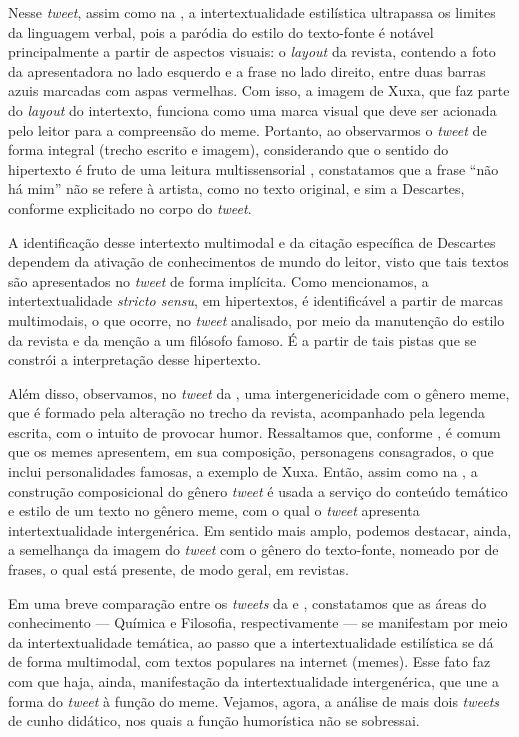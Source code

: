 \documentclass{textolivre}
\begin{document}
Nesse \textit{tweet}, assim como na , a intertextualidade estilística ultrapassa os limites da linguagem verbal, pois a paródia do estilo do texto-fonte é notável principalmente a partir de aspectos visuais: o \textit{layout} da revista, contendo a foto da apresentadora no lado esquerdo e a frase no lado direito, entre duas barras azuis marcadas com aspas vermelhas. Com isso, a imagem de Xuxa, que faz parte do \textit{layout} do intertexto, funciona como uma marca visual que deve ser acionada pelo leitor para a compreensão do meme. Portanto, ao observarmos o \textit{tweet} de forma integral (trecho escrito e imagem), considerando que o sentido do hipertexto é fruto de uma leitura multissensorial \cite{xavier_desafio_2015}, constatamos que a frase “não há mim” não se refere à artista, como no texto original, e sim a Descartes, conforme explicitado no corpo do \textit{tweet}.

A identificação desse intertexto multimodal e da citação específica de Descartes dependem da ativação de conhecimentos de mundo do leitor, visto que tais textos são apresentados no \textit{tweet} de forma implícita. Como mencionamos, a intertextualidade \textit{stricto sensu}, em hipertextos, é identificável a partir de marcas multimodais, o que ocorre, no \textit{tweet} analisado, por meio da manutenção do estilo da revista e da menção a um filósofo famoso. É a partir de tais pistas que se constrói a interpretação desse hipertexto.

Além disso, observamos, no \textit{tweet} da , uma intergenericidade com o gênero meme, que é formado pela alteração no trecho da revista, acompanhado pela legenda escrita, com o intuito de provocar humor. Ressaltamos que, conforme \textcite{testa_uma_2020}, é comum que os memes apresentem, em sua composição, personagens consagrados, o que inclui personalidades famosas, a exemplo de Xuxa. Então, assim como na , a construção composicional do gênero \textit{tweet} é usada a serviço do conteúdo temático e estilo de um texto no gênero meme, com o qual o \textit{tweet} apresenta intertextualidade intergenérica. Em sentido mais amplo, podemos destacar, ainda, a semelhança da imagem do \textit{tweet} com o gênero do texto-fonte, nomeado por \textcite{pedrosa_frases:_2010} de frases, o qual está presente, de modo geral, em revistas.

Em uma breve comparação entre os \textit{tweets} da  e , constatamos que as áreas do conhecimento — Química e Filosofia, respectivamente — se manifestam por meio da intertextualidade temática, ao passo que a intertextualidade estilística se dá de forma multimodal, com textos populares na internet (memes). Esse fato faz com que haja, ainda, manifestação da intertextualidade intergenérica, que une a forma do \textit{tweet} à função do meme. Vejamos, agora, a análise de mais dois \textit{tweets} de cunho didático, nos quais a função humorística não se sobressai.
\end{document}

